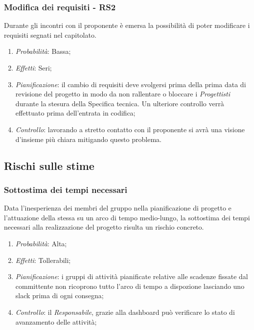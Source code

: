 \subsubsection{Modifica dei requisiti - RS2}
Durante gli incontri con il proponente \`e emersa la possibilit\`a di poter modificare i requisiti segnati nel capitolato.
\begin{enumerate}
\item \textit{Probabilit\`a}: Bassa;
\item \textit{Effetti}: Seri;
\item \textit{Pianificazione}: il cambio di requisiti deve svolgersi prima della prima data di revisione del progetto in modo da non rallentare o bloccare i \textit{Progettisti} durante la stesura della Specifica tecnica. Un ulteriore controllo verr\`a effettuato prima dell'entrata in codifica;
\item \textit{Controllo}: lavorando a stretto contatto con il proponente si avr\`a una visione d'insieme pi\`u chiara mitigando questo problema.
\end{enumerate}

\subsection{Rischi sulle stime}
\subsubsection{Sottostima dei tempi necessari}
Data l'inesperienza dei membri del gruppo nella pianificazione di progetto e l'attuazione della stessa su un arco di tempo medio-lungo, la sottostima dei tempi necessari alla realizzazione del progetto risulta un rischio concreto.
\begin{enumerate}
\item \textit{Probabilit\`a}: Alta;
\item \textit{Effetti}: Tollerabili;
\item \textit{Pianificazione}: i gruppi di attivit\`a pianificate relative alle scadenze fissate dal committente non ricoprono tutto l'arco di tempo a dispozione lasciando uno slack prima di ogni consegna;
\item \textit{Controllo}: il \textit{Responsabile}, grazie alla dashboard pu\`o verificare lo stato di avanzamento delle attivit\`a;
\end{enumerate}

